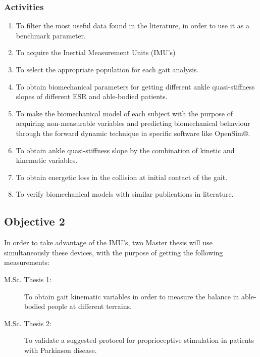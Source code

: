 \documentclass[12pt,english]{article}
\begin{document}
\subsubsection*{Activities}
\begin{enumerate}
\item To filter the most useful data found in the literature, in order to use it as a benchmark parameter.
\item To acquire the Inertial Measurement Units (IMU's) %
\item To select the appropriate population for each gait analysis. %
\item To obtain biomechanical parameters for getting different ankle quasi-stiffness slopes of different ESR and able-bodied patients. %
\item To make the biomechanical model of each subject with the purpose of acquiring non-measurable variables and predicting biomechanical behaviour through the forward dynamic technique in specific software like OpenSim$\circledR$.
\item To obtain ankle quasi-stiffness slope by the combination of kinetic and kinematic variables.
\item To obtain energetic loss in the collision at initial contact of the gait.
\item To verify biomechanical models with similar publications in literature. \end{enumerate}
\subsection{Objective 2}
In order to take advantage of the IMU's, two Master thesis will use simultaneously these devices, with the purpose of getting the following measurements:

\begin{description}
\item [M.Sc. Thesis 1: ]To obtain gait kinematic variables in order to measure the balance in able-bodied people at different terrains.
\item [M.Sc. Thesis 2: ]To validate a suggested protocol for proprioceptive stimulation in patients with Parkinson disease. 
\end{description}
\end{document}
